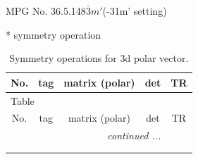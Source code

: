 \documentclass[fleqn,8pt]{jsarticle}
\begin{document}
\setcounter{MaxMatrixCols}{32}

\renewcommand{\tablename}{Table~}
\renewcommand{\figurename}{Figure~}
\begin{center}
\LARGE
MPG No. 36.5.148\quad$\bar{3}m'$\quad(-31m' setting)
\end{center}
* symmetry operation
\renewcommand{\arraystretch}{1.3}
\begin{longtable}{ccccc}
\caption{Symmetry operations for 3d polar vector.}
 \\
 \hline \hline
No. & tag & matrix (polar) & det & TR \\ \hline \endfirsthead

\multicolumn{4}{l}{\tablename\ \thetable{}} \\
 \hline \hline
No. & tag & matrix (polar) & det & TR \\ \hline \endhead

 \hline \hline
\multicolumn{4}{r}{\footnotesize\it continued ...} \\ \endfoot

 \hline \hline
\multicolumn{4}{r}{} \\ \endlastfoot


\end{longtable}
\end{document}
